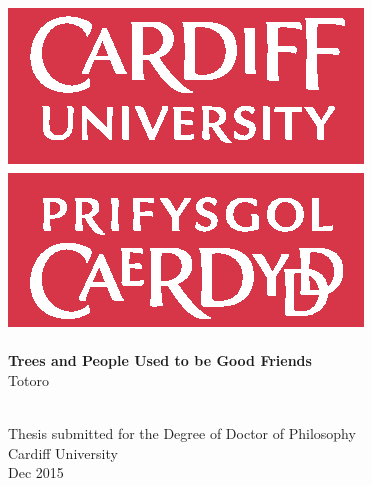 
\begin{titlepage}
\begin{center}

\includegraphics{./fig/universitylogo-spot.eps}~\\[1cm]

\HRule \\[1.5cm]
{ \huge \bfseries Trees and People Used to be Good Friends \\[0.4cm] }
{ \huge Totoro  \\[0.4cm] }
\HRule \\[1.5cm]


\vfill

Thesis submitted for the Degree of Doctor of Philosophy \\ 
Cardiff University\\
Dec 2015

\end{center}
\end{titlepage}